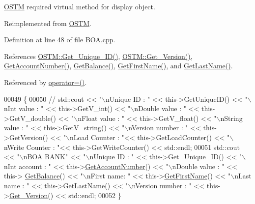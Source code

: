 \hyperlink{class_o_s_t_m}{O\+S\+TM} required virtual method for display object. 



Reimplemented from \hyperlink{class_o_s_t_m_a513396a115f2987fd07c203309ae8a59_a513396a115f2987fd07c203309ae8a59}{O\+S\+TM}.



Definition at line \hyperlink{_b_o_a_8cpp_source_l00048}{48} of file \hyperlink{_b_o_a_8cpp_source}{B\+O\+A.\+cpp}.



References \hyperlink{_o_s_t_m_8cpp_source_l00073}{O\+S\+T\+M\+::\+Get\+\_\+\+Unique\+\_\+\+I\+D()}, \hyperlink{_o_s_t_m_8cpp_source_l00089}{O\+S\+T\+M\+::\+Get\+\_\+\+Version()}, \hyperlink{_b_o_a_8cpp_source_l00074}{Get\+Account\+Number()}, \hyperlink{_b_o_a_8cpp_source_l00066}{Get\+Balance()}, \hyperlink{_b_o_a_8cpp_source_l00090}{Get\+First\+Name()}, and \hyperlink{_b_o_a_8cpp_source_l00082}{Get\+Last\+Name()}.



Referenced by \hyperlink{_b_o_a_8h_source_l00064}{operator=()}.


\begin{DoxyCode}
00049 \{
00050    \textcolor{comment}{// std::cout << "\(\backslash\)nUnique ID : " << this->GetUniqueID() << "\(\backslash\)nInt value : " << this->GetV\_int() <<
       "\(\backslash\)nDouble value : " << this->GetV\_double() << "\(\backslash\)nFloat value : " << this->GetV\_float() << "\(\backslash\)nString value : " <<
       this->GetV\_string()  << "\(\backslash\)nVersion number : " << this->GetVersion() << "\(\backslash\)nLoad Counter : "<<
       this->GetLoadCounter() << "\(\backslash\)nWrite Counter : "<< this->GetWriteCounter() << std::endl;}
00051      std::cout << \textcolor{stringliteral}{"\(\backslash\)nBOA BANK"} << \textcolor{stringliteral}{"\(\backslash\)nUnique ID : "} << this->\hyperlink{class_o_s_t_m_a5a01a8b98d16b1d1904ecf9356e7b71d_a5a01a8b98d16b1d1904ecf9356e7b71d}{Get\_Unique\_ID}() << \textcolor{stringliteral}{"\(\backslash\)nInt account
       : "} << this->\hyperlink{class_b_o_a_ad64bd63675f8902153aa6767994f05dc_ad64bd63675f8902153aa6767994f05dc}{GetAccountNumber}() << \textcolor{stringliteral}{"\(\backslash\)nDouble value : "} << this->
      \hyperlink{class_b_o_a_a07e30b7e5f5f20392b94af7344fd550c_a07e30b7e5f5f20392b94af7344fd550c}{GetBalance}() << \textcolor{stringliteral}{"\(\backslash\)nFirst name: "} << this->\hyperlink{class_b_o_a_ae6bb3df4e1fb210610325ffd1985c7c0_ae6bb3df4e1fb210610325ffd1985c7c0}{GetFirstName}() << \textcolor{stringliteral}{"\(\backslash\)nLast name : "} << 
      this->\hyperlink{class_b_o_a_a081383edefc1f66b80c3fb8862ab070b_a081383edefc1f66b80c3fb8862ab070b}{GetLastName}()  << \textcolor{stringliteral}{"\(\backslash\)nVersion number : "} << this->\hyperlink{class_o_s_t_m_a1f1db9d482f22c8e7caa17dfb340626b_a1f1db9d482f22c8e7caa17dfb340626b}{Get\_Version}() << std::endl;
00052 \}
\end{DoxyCode}


